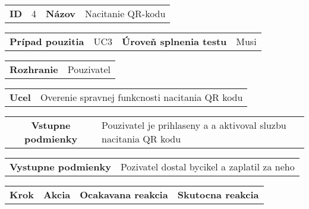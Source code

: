 \begin{table}[h]
  \centering
  \begin{tabularx}{\mytablewidth}{|c|c|c|X|} 
      \hline 
      \textbf{ID} & 4 & \textbf{Názov} & Nacitanie QR-kodu
  \end{tabularx}

  \begin{tabularx}{\mytablewidth}{|c|c|c|X|} 
      \hline 
      \textbf{Prípad pouzitia} & UC3 & \textbf{Úroveň splnenia testu} & Musi
  \end{tabularx}

  \begin{tabularx}{\mytablewidth}{|c|X|} 
      \hline 
      \textbf{Rozhranie} & Pouzivatel
  \end{tabularx}

  \begin{tabularx}{\mytablewidth}{|c|X|} 
      \hline 
      \textbf{Ucel} & Overenie spravnej funkcnosti nacitania QR kodu
  \end{tabularx}

  \begin{tabularx}{\mytablewidth}{|c|X|} 
      \hline 
      \textbf{Vstupne podmienky} & Pouzivatel je prihlaseny a 
                                   a aktivoval sluzbu nacitania QR kodu
  \end{tabularx}

  \begin{tabularx}{\mytablewidth}{|c|X|} 
      \hline 
      \textbf{Vystupne podmienky} & Pozivatel dostal bycikel a zaplatil za neho
  \end{tabularx}

  \begin{tabularx}{\mytablewidth}{|p{2em}|X|X|X|} 
      \hline 
      \textbf{Krok} & \textbf{Akcia} & \textbf{Ocakavana reakcia} & \textbf{Skutocna reakcia}
  \end{tabularx}


\end{table}
